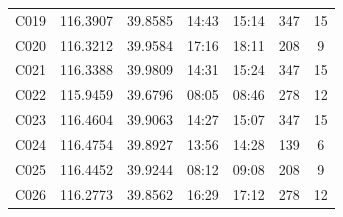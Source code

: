 \documentclass{setp-new}
\begin{document}
\begin{table}[H]
\begin{tabular*}{\textwidth}{@{\extracolsep{\fill}}ccccccc@{}}
C019 & 116.3907 & 39.8585 & 14:43 & 15:14 & 347 & 15\\
C020 & 116.3212 & 39.9584 & 17:16 & 18:11 & 208 & 9\\
C021 & 116.3388 & 39.9809 & 14:31 & 15:24 & 347 & 15\\
C022 & 115.9459 & 39.6796 & 08:05 & 08:46 & 278 & 12\\
C023 & 116.4604 & 39.9063 & 14:27 & 15:07 & 347 & 15\\
C024 & 116.4754 & 39.8927 & 13:56 & 14:28 & 139 & 6\\
C025 & 116.4452 & 39.9244 & 08:12 & 09:08 & 208 & 9\\
C026 & 116.2773 & 39.8562 & 16:29 & 17:12 & 278 & 12\\
\bottomrule
\end{tabular*}
\end{table}
\end{document}
